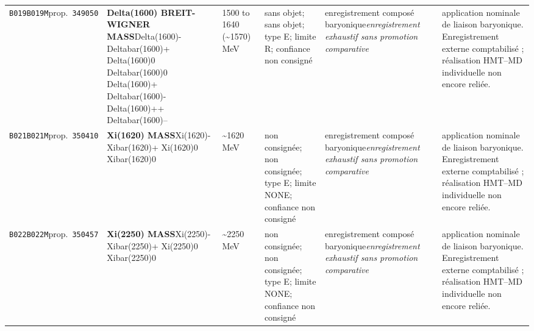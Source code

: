\begin{landscape}
\begin{longtable}{L{1.85cm}L{4.45cm}L{2.35cm}L{4.05cm}L{3.35cm}L{7.15cm}}
\texttt{B019}\newline \texttt{B019M}\newline prop.\ \texttt{349050} & \textbf{Delta(1600) BREIT-WIGNER MASS}\newline Delta(1600)- \textbar{}\allowbreak{} Deltabar(1600)+ \textbar{}\allowbreak{} Delta(1600)0 \textbar{}\allowbreak{} Deltabar(1600)0 \textbar{}\allowbreak{} Delta(1600)+ \textbar{}\allowbreak{} Deltabar(1600)- \textbar{}\allowbreak{} Delta(1600)++ \textbar{}\allowbreak{} Deltabar(1600)-- & 1500 to 1640 (\textasciitilde{}1570)\,MeV & sans objet; sans objet; type E; limite R; confiance non consigné & enregistrement composé baryonique\newline \emph{enregistrement exhaustif sans promotion comparative} & application nominale de liaison baryonique. Enregistrement externe comptabilisé ; réalisation HMT--MD individuelle non encore reliée. \\
\texttt{B021}\newline \texttt{B021M}\newline prop.\ \texttt{350410} & \textbf{Xi(1620) MASS}\newline Xi(1620)- \textbar{}\allowbreak{} Xibar(1620)+ \textbar{}\allowbreak{} Xi(1620)0 \textbar{}\allowbreak{} Xibar(1620)0 & \textasciitilde{}1620\,MeV & non consignée; non consignée; type E; limite NONE; confiance non consigné & enregistrement composé baryonique\newline \emph{enregistrement exhaustif sans promotion comparative} & application nominale de liaison baryonique. Enregistrement externe comptabilisé ; réalisation HMT--MD individuelle non encore reliée. \\
\texttt{B022}\newline \texttt{B022M}\newline prop.\ \texttt{350457} & \textbf{Xi(2250) MASS}\newline Xi(2250)- \textbar{}\allowbreak{} Xibar(2250)+ \textbar{}\allowbreak{} Xi(2250)0 \textbar{}\allowbreak{} Xibar(2250)0 & \textasciitilde{}2250\,MeV & non consignée; non consignée; type E; limite NONE; confiance non consigné & enregistrement composé baryonique\newline \emph{enregistrement exhaustif sans promotion comparative} & application nominale de liaison baryonique. Enregistrement externe comptabilisé ; réalisation HMT--MD individuelle non encore reliée. \\

\end{longtable}
\end{landscape}

